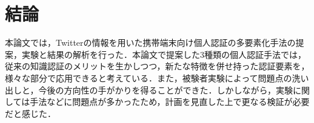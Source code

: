 \chapter{結論}\label{chap:conclusion}
本論文では，Twitterの情報を用いた携帯端末向け個人認証の多要素化手法の提案，実験と結果の解析を行った．本論文で提案した3種類の個人認証手法では，従来の知識認証のメリットを生かしつつ，新たな特徴を併せ持った認証要素を，様々な部分で応用できると考えている．また，被験者実験によって問題点の洗い出しと，今後の方向性の手がかりを得ることができた．しかしながら，実験に関しては手法などに問題点が多かったため，計画を見直した上で更なる検証が必要だと感じた．


\newpage
